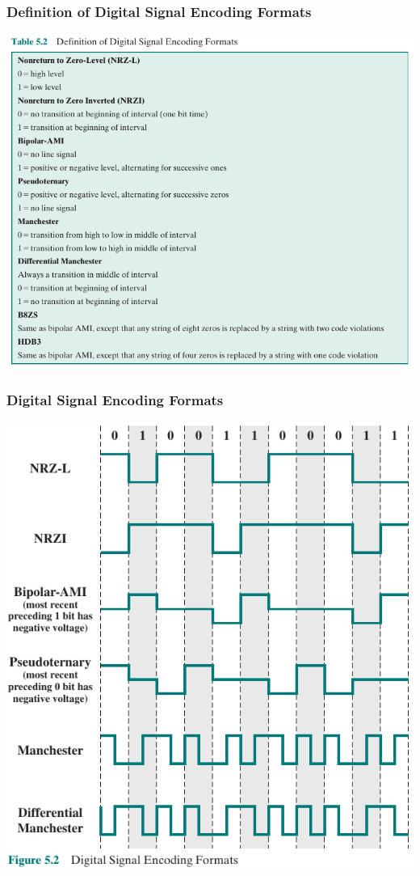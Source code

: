 \documentclass[pdflatex,compress]{beamer}
\begin{document}
\begin{frame}
	\frametitle{Definition of Digital Signal Encoding Formats}
	\begin{center}
		\includegraphics[width=0.7\linewidth]{img/img03}
	\end{center}
\end{frame}

\begin{frame}
	\frametitle{Digital Signal Encoding Formats}
	\begin{center}
		\includegraphics[width=0.6\linewidth]{img/img04}
	\end{center}
\end{frame}
\end{document}
